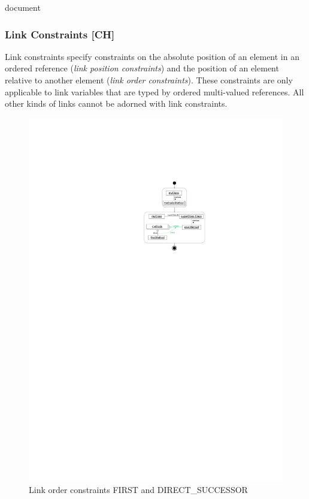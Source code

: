 {  document
\subsubsection{Link Constraints [CH]}
\label{sec:StoryPatterns:specialLinks:linkConstraints}

Link constraints specify constraints on the absolute position of an element in an ordered reference (\emph{link position constraints}) and the position of an element relative to another element (\emph{link order constraints}). These constraints are only applicable to link variables that are typed by ordered multi-valued references. All other kinds of links cannot be adorned with link constraints.



\begin{figure}[p]
  \centering
  \includegraphics[scale=.8]{figures/LinkConstraints1}
  \caption{Link order constraints FIRST and DIRECT\_SUCCESSOR}
  \label{fig:linkConstraints}
\end{figure}

}
